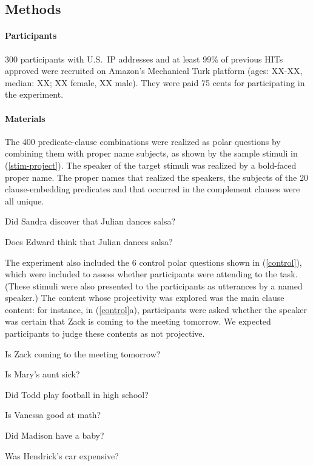 \documentclass[11pt,fleqn]{article}
\newcommand{\6}{\mbox{$[\hspace*{-.6mm}[$}}
\newcommand{\9}{\mbox{$]\hspace*{-.6mm}]$}}
\begin{document}
\subsection{Methods}

\paragraph{Participants} 300 participants with U.S.\ IP addresses and at least 99\% of previous HITs approved were recruited on Amazon's Mechanical Turk platform (ages: XX-XX, median: XX; XX female, XX male). They were paid 75 cents for participating in the experiment.

\paragraph{Materials} The 400 predicate-clause combinations were realized as polar questions by combining them with proper name subjects, as shown by the sample stimuli in (\ref{stim-project}).  The speaker of the target stimuli was realized by a bold-faced proper name. The proper names that realized the speakers, the subjects of the 20 clause-embedding predicates and that occurred in the complement clauses were all unique. 

\begin{exe}
\ex\label{stim-project} 
\begin{xlist}
 Did Sandra discover that Julian dances salsa?

 Does Edward think that Julian dances salsa?
\end{xlist}
\end{exe}

The experiment also included the 6 control polar questions shown in (\ref{control}), which were included to assess whether participants were attending to the task. (These stimuli were also presented to the participants as utterances by a named speaker.) The content whose projectivity was explored was the main clause content: for instance, in (\ref{control}a), participants were asked whether the speaker was certain that Zack is coming to the meeting tomorrow. We expected participants to judge these contents as not projective.

\begin{exe}
\ex\label{control} 
\begin{xlist}

\ex   Is Zack coming to the meeting tomorrow?

\ex Is Mary's aunt sick?

\ex Did Todd play football in high school?

\ex Is Vanessa good at math?

\ex Did Madison have a baby?

\ex Was Hendrick's car expensive?

\end{xlist}
\end{exe}
\end{document}

